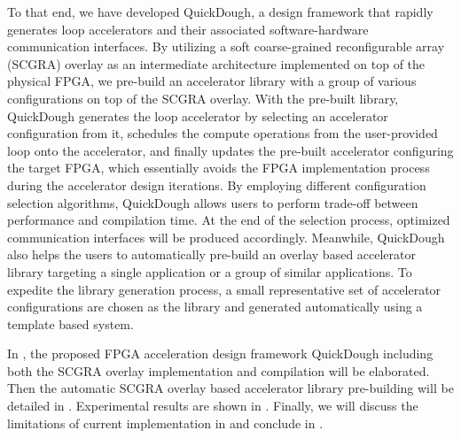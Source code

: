 To that end, we have developed QuickDough, a design framework that rapidly generates loop accelerators and their associated software-hardware communication interfaces. By utilizing a soft coarse-grained reconfigurable array (SCGRA) overlay as an intermediate architecture implemented on top of the physical FPGA, we pre-build an accelerator library with a group of various configurations on top of the SCGRA overlay. With the pre-built library, QuickDough generates the loop accelerator by selecting an accelerator configuration from it, schedules the compute operations from the user-provided loop onto the accelerator, and finally updates the pre-built accelerator configuring the target FPGA, which essentially avoids the FPGA implementation process during the accelerator design iterations. By employing different configuration selection algorithms, QuickDough allows users to perform trade-off between performance and compilation time. At the end of the selection process, optimized communication interfaces will be produced accordingly. Meanwhile, QuickDough also helps the users to automatically pre-build an overlay based accelerator library targeting a single application or a group of similar applications. To expedite the library generation process, a small representative set of accelerator configurations are chosen as the library and generated automatically using a template based system.

In , the proposed FPGA acceleration design framework QuickDough including both the SCGRA overlay implementation and compilation will be elaborated. Then the automatic SCGRA overlay based accelerator library pre-building will be detailed in . Experimental results are shown in . Finally, we will discuss the limitations of current implementation in  and conclude in .
